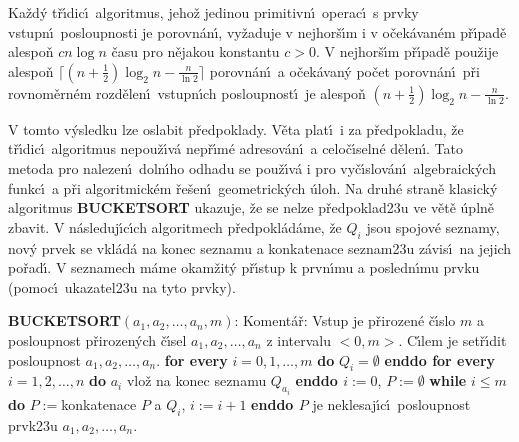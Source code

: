 Ka\v zd\'y t\v r\'\i dic\'\i\ algoritmus, jeho\v z jedinou 
primitivn\'\i\ ope\-rac\'\i\ s prvky vstupn\'\i\ posloupnosti je 
porovn\'an\'\i , vy\v zaduje v nej\-hor\v s\'\i m i v o\v cek\'avan\'em p\v r\'\i pad\v e 
alespo\v n $cn\log n$ \v casu pro n\v eja\-kou konstantu $c>0$.  V 
nejhor\v s\'\i m p\v r\'\i pad\v e pou\v zije alespo\v n $\lceil 
(n+\frac 12)\log_2n-\frac n{\ln2}\rceil$ 
porovn\'an\'\i\ a o\v cek\'avan\'y po\v cet porovn\'an\'\i\ p\v ri rovnom\v ern\'em 
rozd\v elen\'\i\ vstupn\'\i ch posloupnost\'\i\ je alespo\v n 
$(n+\frac 12)\log_2n-\frac n{\ln2}$.  
\endproclaim

\flushpar V tomto v\'ysledku lze oslabit p\v redpoklady. V\v eta 
plat\'\i\ i za 
p\v red\-pokladu, \v ze t\v r\'\i dic\'\i\ algoritmus nepou\v z\'\i v\'a nep\v r\'\i m\'e 
adreso\-v\'an\'\i\ a celo\-\v c\'\i seln\'e d\v elen\'\i . Tato metoda pro 
nalezen\'\i\ doln\'\i ho odhadu se pou\v z\'\i v\'a i pro vy\v c\'\i slov\'an\'\i\ 
algebraick\'ych funkc\'\i\ a p\v ri algoritmick\'em \v re\v sen\'\i\ 
geometrick\'ych \'uloh. Na druh\'e stran\v e klasick\'y algoritmus 
{\bf BUCKETSORT} ukazuje, \v ze se nelze p\v red\-poklad\accent23u 
ve v\v et\v e \'upln\v e zbavit. V n\'asleduj\'\i c\'\i ch algoritmech 
p\v red\-po\-kl\'a\-d\'ame, \v ze $Q_i$ jsou spojov\'e seznamy, nov\'y 
prvek se vkl\'ad\'a na konec seznamu a konkatenace 
seznam\accent23u z\'avis\'\i\ na jejich po\v rad\'\i . V 
seznamech m\'ame okam\v zit\'y p\v r\'\i stup k prvn\'\i mu a posledn\'\i mu 
prvku (pomoc\'\i\ ukazatel\accent23u na tyto prvky).
\bigskip

{\bf BUCKETSORT$(a_1,a_2,\dots,a_n,m)$}:\newline 
Koment\'a\v r: Vstup je p\v rirozen\'e \v c\'\i slo $m$ a posloupnost 
p\v riroze\-n\'ych \v c\'\i sel $a_1,a_2,\dots,a_n$ z intervalu $
<0,m>$. 
C\'\i lem je set\v r\'\i dit posloupnost $a_1,a_2,\dots,a_n$.\newline 
{\bf for every} $i=0,1,\dots,m$ {\bf do} $Q_i=\emptyset$ {\bf enddo\newline 
for every} $i=1,2,\dots,n$ {\bf do}\newline 
\phantom{---}$a_i$ vlo\v z na konec seznamu $Q_{a_i}$\newline 
{\bf enddo\newline 
$i:=0$}, $P:=\emptyset$\newline
{\bf while} $i\le m$ {\bf do}\newline 
\phantom{---}$P:=$konkatenace $P$ a $Q_i$, $i:=i+1$\newline 
{\bf enddo\newline 
$P$} je neklesaj\'\i c\'\i\ posloupnost prvk\accent23u 
$a_1,a_2,\dots,a_n$.
\medskip

